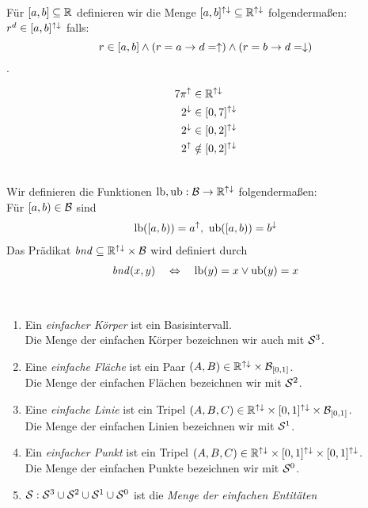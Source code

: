 \begin{dfn}\ \\
    Für $[a,b] \subseteq \mathbb{R}$ definieren wir die Menge $[a,b]^{{\uparrow \downarrow}} \subseteq \mathbb{R}^{{\uparrow \downarrow}}$ folgendermaßen: $r^d \in [a,b]^{{\uparrow \downarrow}}$ falls:
    $$r \in [a,b] \land (r = a \to d=\uparrow) \land (r=b \to d=\downarrow)$$.
\end{dfn}


\begin{bsp}
    \begin{align*}
        7\pi^{\uparrow} &\in \mathbb{R}^{{\uparrow \downarrow}} \\
        2^{\downarrow} &\in [0,7]^{{\uparrow \downarrow}} \\
        2^{\downarrow} &\in [0,2]^{{\uparrow \downarrow}} \\
        2^{\uparrow} &\notin [0,2]^{{\uparrow \downarrow}}
    \end{align*}
\end{bsp}


\begin{dfn}\ \\
    Wir definieren die Funktionen $\text{lb}, \text{ub}: \mathcal{B} \to \mathbb{R}^{{\uparrow \downarrow}}$ folgendermaßen:\\
    Für $[a,b) \in \mathcal{B}$ sind
    \begin{align*}
        \text{lb}([a,b)) = a^{\uparrow},\ \text{ub}([a,b)) = b^{\downarrow}
    \end{align*}
    Das Prädikat $\mathit{bnd} \subseteq \mathbb{R}^{{\uparrow \downarrow}} \times \mathcal{B}$ wird definiert durch
    \begin{align*}
        \mathit{bnd}(x,y) \quad \Leftrightarrow \quad \text{lb}(y)=x \lor \text{ub}(y)=x
    \end{align*}
\end{dfn}


\begin{dfn}\ %
    \begin{enumerate}
        \item Ein \emph{einfacher Körper} ist ein Basisintervall.\\ 
            Die Menge der einfachen Körper bezeichnen wir auch mit $\mathcal{S}^3$.
        \item Eine \emph{einfache Fläche} ist ein Paar $(A,B) \in \mathbb{R}^{{\uparrow \downarrow}} \times \mathcal{B}_{[0,1]}$.\\
            Die Menge der einfachen Flächen bezeichnen wir mit $\mathcal{S}^2$.
        \item Eine \emph{einfache Linie} ist ein Tripel $(A,B,C) \in \mathbb{R}^{{\uparrow \downarrow}} \times [0,1]^{{\uparrow \downarrow}} \times \mathcal{B}_{[0,1]}$.\\
            Die Menge der einfachen Linien bezeichnen wir mit $\mathcal{S}^1$.
        \item Ein \emph{einfacher Punkt} ist ein Tripel $(A,B,C) \in \mathbb{R}^{{\uparrow \downarrow}} \times [0,1]^{{\uparrow \downarrow}} \times [0,1]^{{\uparrow \downarrow}}$.\\
            Die Menge der einfachen Punkte bezeichnen wir mit $\mathcal{S}^0$.
        \item $\mathcal{S} : \mathcal{S}^3 \cup \mathcal{S}^2 \cup \mathcal{S}^1 \cup \mathcal{S}^0$ ist die \emph{Menge der einfachen Entitäten}
    \end{enumerate}
\end{dfn}


